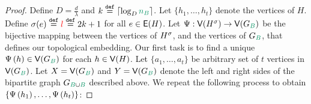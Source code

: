 \documentclass[11pt]{article}
\begin{document}
\begin{proof}
Define $D = \frac{d}{\lambda}$ and $k \Def \lceil\log_D\na\rceil$.
Let $\{ h_1, \dots, h_t\}$ denote the vertices of $H$.
Define $\sigma(e) \text{}\overset{\mathtt{def}}{=} \textcolor{red}{l} \text{}\overset{\mathtt{def}}{=} 2k+1$ for all $e \in \mathsf{E}(H)$.
Let $\EmbeddingFunc: \Vertices{\Subdivision{H}{\sigma}} \rightarrow \Vertices{G_{\GreenB}}$ be the bijective mapping between the vertices of ${H}^{\sigma}$, and the vertices of $G_{\GreenB}$, that defines our topological embedding.
Our first task is to find a unique $\Embedding{h} \in \Vertices{G_{\GreenB}}$ for each $h \in \mathsf{V}(H)$.
Let $\{a_1, \dots, a_{t}\}$ be arbitrary set of $t$ vertices in $\Vertices{G_{\GreenB}}$.
Let $X=\Vertices{G_{\GreenB}}$ and $Y=\Vertices{G_{\GreenB}}$ denote the left and right sides of the bipartite graph $\BipartiteG$ described above.
We repeat the following process to obtain $\{ \Psi\left(h_1\right), \dots, \Psi\left(h_t\right)\}$: 


\end{proof}
\end{document}
